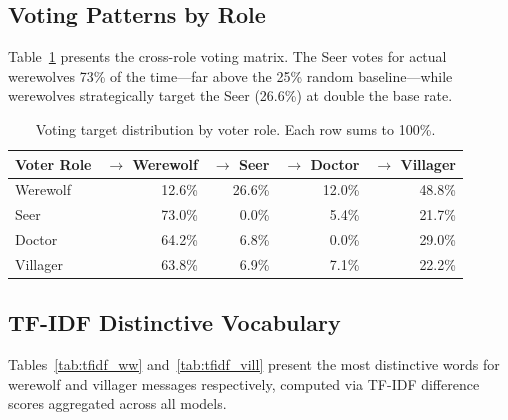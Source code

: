 \subsection{Voting Patterns by Role}
\label{app:voting}

Table~\ref{tab:voting_matrix} presents the cross-role voting matrix. The Seer votes for actual werewolves 73\% of the time---far above the 25\% random baseline---while werewolves strategically target the Seer (26.6\%) at double the base rate.

\begin{table}[ht]
\caption{Voting target distribution by voter role. Each row sums to 100\%.}
\label{tab:voting_matrix}
\centering
\small
\begin{tabular}{lrrrr}
\toprule
\textbf{Voter Role} & \textbf{$\rightarrow$ Werewolf} & \textbf{$\rightarrow$ Seer} & \textbf{$\rightarrow$ Doctor} & \textbf{$\rightarrow$ Villager} \\
\midrule
Werewolf & 12.6\% & 26.6\% & 12.0\% & 48.8\% \\
Seer     & 73.0\% &  0.0\% &  5.4\% & 21.7\% \\
Doctor   & 64.2\% &  6.8\% &  0.0\% & 29.0\% \\
Villager & 63.8\% &  6.9\% &  7.1\% & 22.2\% \\
\bottomrule
\end{tabular}
\end{table}


\subsection{TF-IDF Distinctive Vocabulary}
\label{app:tfidf}

Tables~\ref{tab:tfidf_ww} and~\ref{tab:tfidf_vill} present the most distinctive words for werewolf and villager messages respectively, computed via TF-IDF difference scores aggregated across all models.

